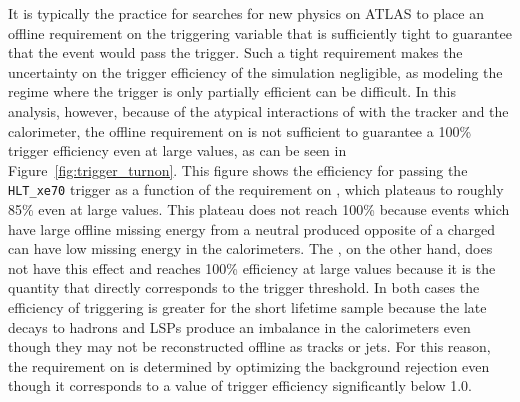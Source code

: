 It is typically the practice for searches for new physics on ATLAS to place an offline requirement on the triggering variable that is sufficiently tight to guarantee that the event would pass the trigger.
Such a tight requirement makes the uncertainty on the trigger efficiency of the simulation negligible, as modeling the regime where the trigger is only partially efficient can be difficult.
In this analysis, however, because of the atypical interactions of \rhadrons with the tracker and the calorimeter, the offline requirement on \met is not sufficient to guarantee a 100\% trigger efficiency even at large values, as can be seen in Figure~\ref{fig:trigger_turnon}.
This figure shows the efficiency for passing the \texttt{HLT\_xe70} trigger as a function of the requirement on \met, which plateaus to roughly 85\% even at large values.
This plateau does not reach 100\% because events which have large offline missing energy from a neutral \rhadron produced opposite of a charged \rhadron can have low missing energy in the calorimeters.
The \calomet, on the other hand, does not have this effect and reaches 100\% efficiency at large values because it is the quantity that directly corresponds to the trigger threshold.
In both cases the efficiency of triggering is greater for the short lifetime sample because the late decays to hadrons and \acp{LSP} produce an imbalance in the calorimeters even though they may not be reconstructed offline as tracks or jets.
For this reason, the requirement on \met is determined by optimizing the background rejection even though it corresponds to a value of trigger efficiency significantly below 1.0.

